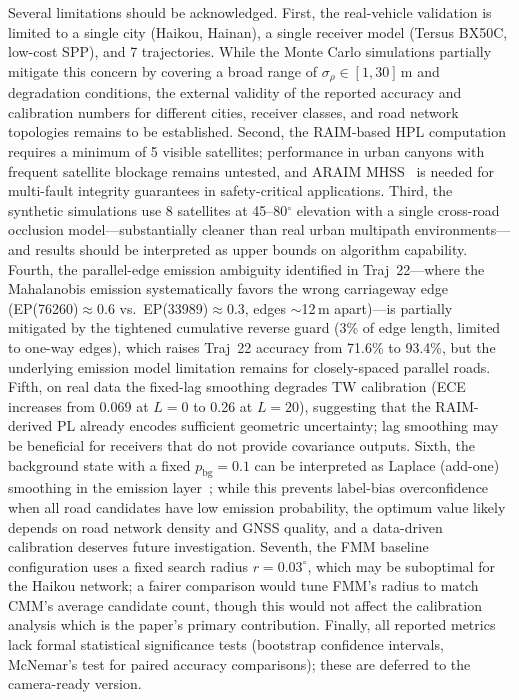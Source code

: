 \documentclass[letterpaper,journal]{IEEEtran}
\begin{document}
Several limitations should be acknowledged. First, the real-vehicle
validation is limited to a single city (Haikou, Hainan), a single
receiver model (Tersus BX50C, low-cost SPP), and 7 trajectories. While
the Monte Carlo simulations partially mitigate this concern by covering
a broad range of $\sigma_{\rho} \in [1,30]$\,m and degradation
conditions, the external validity of the reported accuracy and
calibration numbers for different cities, receiver classes, and road
network topologies remains to be established. Second, the RAIM-based HPL
computation requires a minimum of 5 visible satellites; performance in
urban canyons with frequent satellite blockage remains untested, and
ARAIM MHSS~\cite{Zhang2019} is needed for multi-fault integrity
guarantees in safety-critical applications. Third, the synthetic
simulations use 8 satellites at 45--80$^\circ$ elevation with a single
cross-road occlusion model---substantially cleaner than real urban
multipath environments---and results should be interpreted as upper
bounds on algorithm capability. Fourth, the parallel-edge
emission ambiguity identified in Traj~22---where the Mahalanobis
emission systematically favors the wrong carriageway edge
(EP(76260)$\approx$0.6 vs.\ EP(33989)$\approx$0.3, edges $\sim$12\,m
apart)---is partially mitigated by the tightened cumulative reverse
guard (3\% of edge length, limited to one-way edges), which raises
Traj~22 accuracy from 71.6\% to 93.4\%, but the underlying emission
model limitation remains for closely-spaced parallel roads. Fifth, on
real data the fixed-lag smoothing degrades TW calibration (ECE
increases from 0.069 at $L=0$ to 0.26 at $L=20$), suggesting that the
RAIM-derived PL already encodes sufficient geometric uncertainty; lag
smoothing may be beneficial for receivers that do not provide covariance
outputs. Sixth, the
background state with a fixed $p_{\text{bg}}=0.1$ can be interpreted as
Laplace (add-one) smoothing in the emission layer~\cite{Guo2017}; while
this prevents label-bias overconfidence when all road candidates have
low emission probability, the optimum value likely depends on road
network density and GNSS quality, and a data-driven calibration
deserves future investigation. Seventh, the FMM baseline configuration
uses a fixed search radius $r=0.03^\circ$, which may be suboptimal for
the Haikou network; a fairer comparison would tune FMM's radius to
match CMM's average candidate count, though this would not affect the
calibration analysis which is the paper's primary contribution. Finally,
all reported metrics lack formal statistical significance tests
(bootstrap confidence intervals, McNemar's test for paired accuracy
comparisons); these are deferred to the camera-ready version.
\end{document}
